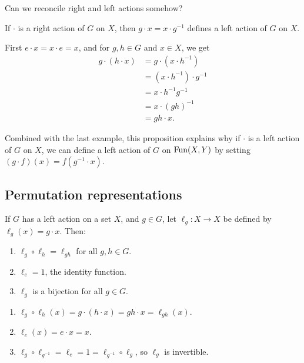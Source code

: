 \documentclass[12pt,letterpaper]{report}
\begin{document}
Can we reconcile right and left actions somehow?

\begin{prop}{}{}
  If $\cdot$ is a right action of $G$ on $X$, then $g \cdot x = x \cdot g^{-1}$ defines a left
  action of $G$ on $X$.
\end{prop}

\begin{thmproof}
  First $e \cdot x = x \cdot e = x$, and for $g, h \in G$ and $x \in X$, we get
  \begin{align*}
    g \cdot (h \cdot x)
    &= g \cdot (x \cdot h^{-1}) \\
    &= (x \cdot h^{-1}) \cdot g^{-1} \\
    &= x \cdot h^{-1}g^{-1} \\
    &= x \cdot (gh)^{-1} \\
    &= gh \cdot x.
  \end{align*}
\end{thmproof}

Combined with the last example, this proposition explains why if $\cdot$ is a left action of $G$
on $X$, we can define a left action of $G$ on $\operatorname{Fun}(X, Y)$ by setting
$(g \cdot f)(x) = f(g^{-1} \cdot x)$.

\pagebreak
\subsection{Permutation representations}

\begin{lem}{}{}
  If $G$ has a left action on a set $X$, and $g \in G$, let $\ell_g \colon X \to X$ be defined by
  $\ell_g(x) = g \cdot x$.
  Then:
  \begin{enumerate}
    \item $\ell_g \circ \ell_h = \ell_{gh}$ for all $g, h \in G$.
    \item $\ell_e = 1$, the identity function.
    \item $\ell_g$ is a bijection for all $g \in G$.
  \end{enumerate}
\end{lem}

\begin{thmproof}
  \begin{enumerate}
    \item $\ell_g \circ \ell_h(x) = g \cdot (h \cdot x) = gh \cdot x = \ell_{gh}(x)$.
    \item $\ell_e(x) = e \cdot x = x$.
    \item $\ell_g \circ \ell_{g^{-1}} = \ell_e = 1 = \ell_{g^{-1}} \circ \ell_g$, so $\ell_g$ is
      invertible.
  \end{enumerate}
\end{thmproof}
\end{document}
